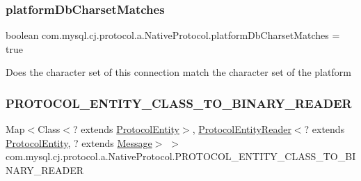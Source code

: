 \subsubsection{\texorpdfstring{platform\+Db\+Charset\+Matches}{platformDbCharsetMatches}}
{\footnotesize\ttfamily boolean com.\+mysql.\+cj.\+protocol.\+a.\+Native\+Protocol.\+platform\+Db\+Charset\+Matches = true\hspace{0.3cm}{\ttfamily [protected]}}

Does the character set of this connection match the character set of the platform \mbox{\label{classcom_1_1mysql_1_1cj_1_1protocol_1_1a_1_1_native_protocol_a7a0bae11d1173c65e19e4a20904fd60b}} 
\subsubsection{\texorpdfstring{P\+R\+O\+T\+O\+C\+O\+L\+\_\+\+E\+N\+T\+I\+T\+Y\+\_\+\+C\+L\+A\+S\+S\+\_\+\+T\+O\+\_\+\+B\+I\+N\+A\+R\+Y\+\_\+\+R\+E\+A\+D\+ER}{PROTOCOL\_ENTITY\_CLASS\_TO\_BINARY\_READER}}
{\footnotesize\ttfamily Map$<$Class$<$? extends \mbox{\hyperlink{interfacecom_1_1mysql_1_1cj_1_1protocol_1_1_protocol_entity}{Protocol\+Entity}}$>$, \mbox{\hyperlink{interfacecom_1_1mysql_1_1cj_1_1protocol_1_1_protocol_entity_reader}{Protocol\+Entity\+Reader}}$<$? extends \mbox{\hyperlink{interfacecom_1_1mysql_1_1cj_1_1protocol_1_1_protocol_entity}{Protocol\+Entity}}, ? extends \mbox{\hyperlink{interfacecom_1_1mysql_1_1cj_1_1protocol_1_1_message}{Message}}$>$ $>$ com.\+mysql.\+cj.\+protocol.\+a.\+Native\+Protocol.\+P\+R\+O\+T\+O\+C\+O\+L\+\_\+\+E\+N\+T\+I\+T\+Y\+\_\+\+C\+L\+A\+S\+S\+\_\+\+T\+O\+\_\+\+B\+I\+N\+A\+R\+Y\+\_\+\+R\+E\+A\+D\+ER\hspace{0.3cm}{\ttfamily [protected]}}

